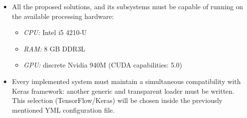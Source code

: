 \begin{itemize}
	\item All the proposed solutions, and its subsystems must be capable of running on the available processing hardware:
	\begin{itemize}
		\item \emph{CPU:} Intel i5 4210-U
		\item \emph{RAM:} 8 GB DDR3L
		\item \emph{GPU:} discrete Nvidia 940M (CUDA capabilities: 5.0)
	\end{itemize}
	
	\label{sec:2_available_hw}
	\item Every implemented system must maintain a simultaneous compatibility with Keras framework: another generic and transparent loader must be written. This selection (TensorFlow/Keras) will be chosen inside the previously mentioned YML configuration file.
\end{itemize}
